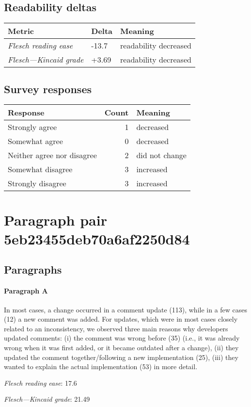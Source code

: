 \subsection{Readability deltas}

\begin{tabular}{lll}
\toprule
               \textbf{Metric} & \textbf{Delta} &       \textbf{Meaning} \\
\midrule
    \emph{Flesch reading ease} &          -13.7 &  readability decreased \\
 \emph{Flesch---Kincaid grade} &          +3.69 &  readability decreased \\
\bottomrule
\end{tabular}

\subsection{Survey responses}
\begin{tabular}{lrl}
\toprule
          \textbf{Response} &  \textbf{Count} & \textbf{Meaning} \\
\midrule
             Strongly agree &               1 &        decreased \\
             Somewhat agree &               0 &        decreased \\
 Neither agree nor disagree &               2 &   did not change \\
          Somewhat disagree &               3 &        increased \\
          Strongly disagree &               3 &        increased \\
\bottomrule
\end{tabular}

\section{Paragraph pair 5eb23455deb70a6af2250d84}
\subsection{Paragraphs}
\paragraph{Paragraph A}
In most cases, a change occurred in a comment update (113), while in a few cases (12) a new comment was added. For updates, which were in most cases closely related to an inconsistency, we observed three main reasons why developers updated comments: (i) the comment was wrong before (35) (i.e., it was already wrong when it was first added, or it became outdated after a change), (ii) they updated the comment together/following a new implementation (25), (iii) they wanted to explain the actual implementation (53) in more detail.\par\medskip
\emph{Flesch reading ease}: 17.6\par
\emph{Flesch---Kincaid grade}: 21.49

